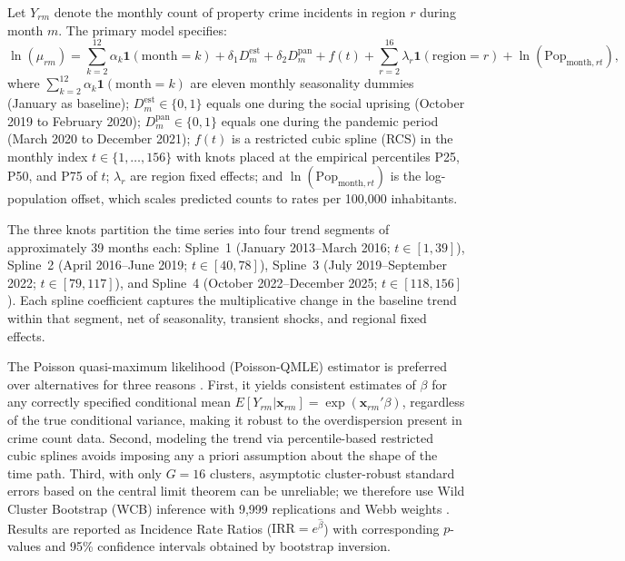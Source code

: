 \documentclass[pdflatex,sn-basic]{sn-jnl}
\begin{document}
Let $Y_{rm}$ denote the monthly count of property crime incidents in region $r$ during month $m$. The primary model specifies:
\begin{equation}
  \ln(\mu_{rm})
  = \sum_{k=2}^{12} \alpha_k \mathbf{1}(\text{month}=k)
  + \delta_1 D^{\text{est}}_m + \delta_2 D^{\text{pan}}_m
  + f(t) + \sum_{r=2}^{16} \lambda_r \mathbf{1}(\text{region}=r)
  + \ln(\text{Pop}_{\text{month},rt}),
  \label{eq:poisson}
\end{equation}
where $\sum_{k=2}^{12}\alpha_k\mathbf{1}(\text{month}=k)$ are eleven monthly seasonality dummies (January as baseline); $D^{\text{est}}_m \in \{0,1\}$ equals one during the social uprising (October 2019 to February 2020); $D^{\text{pan}}_m \in \{0,1\}$ equals one during the pandemic period (March 2020 to December 2021); $f(t)$ is a restricted cubic spline (RCS) in the monthly index $t \in \{1,\ldots,156\}$ with knots placed at the empirical percentiles P25, P50, and P75 of $t$; $\lambda_r$ are region fixed effects; and $\ln(\text{Pop}_{\text{month},rt})$ is the log-population offset, which scales predicted counts to rates per 100,000 inhabitants.

The three knots partition the time series into four trend segments of approximately 39 months each: Spline~1 (January 2013--March 2016; $t \in [1,39]$), Spline~2 (April 2016--June 2019; $t \in [40,78]$), Spline~3 (July 2019--September 2022; $t \in [79,117]$), and Spline~4 (October 2022--December 2025; $t \in [118,156]$). Each spline coefficient captures the multiplicative change in the baseline trend within that segment, net of seasonality, transient shocks, and regional fixed effects.

The Poisson quasi-maximum likelihood (Poisson-QMLE) estimator is preferred over alternatives for three reasons \citep{gourieroux1984,wooldridge2010,osgood2000,silvatenenreyro2006}. First, it yields consistent estimates of $\beta$ for any correctly specified conditional mean $E[Y_{rm}|\mathbf{x}_{rm}] = \exp(\mathbf{x}_{rm}'\beta)$, regardless of the true conditional variance, making it robust to the overdispersion present in crime count data. Second, modeling the trend via percentile-based restricted cubic splines avoids imposing any a priori assumption about the shape of the time path. Third, with only $G = 16$ clusters, asymptotic cluster-robust standard errors based on the central limit theorem can be unreliable; we therefore use Wild Cluster Bootstrap (WCB) inference with 9,999 replications and Webb weights \citep{cameron2015,mackinnon2023}. Results are reported as Incidence Rate Ratios ($\text{IRR} = e^{\hat\beta}$) with corresponding $p$-values and 95\% confidence intervals obtained by bootstrap inversion.
\end{document}
